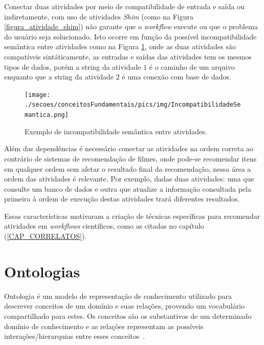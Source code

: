 Conectar duas atividades por meio de compatibilidade de entrada e saída ou indiretamente, com uso de atividades \emph{Shim} (como na Figura \ref{figura_atividade_shim}) não garante que o \emph{workflow} execute ou que o problema do usuário seja solucionado. Isto ocorre em função da possível incompatibilidade semântica entre atividades como na Figura \ref{figura_Incompatibilidade_Semantica}, 
onde as duas atividades são compatíveis sintáticamente, as entradas e saídas das atividades tem os mesmos tipos de dados, porém a string da atividade \(1\) é o caminho de um arquivo enquanto que a string da atividade \(2\) é uma conexão com base de dados.
\begin{figure}[!htb]
    \centering  
    \caption{Exemplo de incompatibilidade semântica entre atividades.}
    \texttt{[image: ./secoes/conceitosFundamentais/pics/img/IncompatibilidadeSemantica.png]}    
	\label{figura_Incompatibilidade_Semantica}
\end{figure}

Além das dependências é necessário conectar as atividades na ordem correta ao contrário de sistemas de recomendação de filmes, onde  pode-se recomendar itens em qualquer ordem sem afetar o resultado final da recomendação, nessa área a ordem das atividades é relevante. Por exemplo, dadas duas atividades: uma que consulte um banco de dados e outra que atualize a informação consultada pela primeira à ordem de execução destas atividades trará diferentes resultados.

Essas características motivaram a criação de técnicas específicas para recomendar atividades em \emph{workflows} científicos, como as citadas no capítulo (\ref{CAP_CORRELATOS}).


\section{Ontologias}\label{SEC_ONTOLOGIA}
Ontologia é um modelo de representação de conhecimento utilizado para descrever conceitos de um domínio e suas relações, provendo um vocabulário compartilhado para estes. Os conceitos são os substantivos de um determinado domínio de conhecimento e as relações representam as possíveis interações/hierarquias entre esses conceitos~\cite{Umamaheswari2012}.


